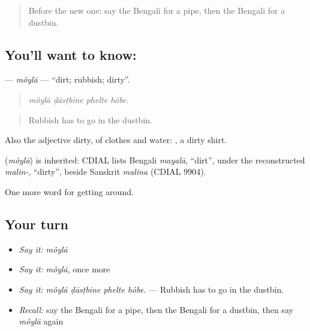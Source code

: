 \begin{quote}
Before the new one: say the Bengali for a pipe, then the Bengali for a dustbin.
\end{quote}

\subsection*{You'll want to know: }
\textbf{} — \emph{môylā} — \textquotedblleft{}dirt; rubbish; dirty\textquotedblright{}.

\begin{quote}
   
\end{quote}

\begin{quote}
\emph{môylā ḍāsṭbine phelte hôbe.}
\end{quote}

\begin{quote}
Rubbish has to go in the dustbin.
\end{quote}

Also the adjective dirty, of clothes and water:  , a dirty shirt.

\begin{cousinweb}
\textbf{} (\emph{môylā}) is inherited: CDIAL lists Bengali \emph{mayalā}, \textquotedblleft{}dirt\textquotedblright{}, under the reconstructed \emph{malin-}, \textquotedblleft{}dirty\textquotedblright{}, beside Sanskrit \emph{malina} (CDIAL 9904).
\end{cousinweb}

\begin{grammarlens}[title={What you've built}]
One more word for getting around.
\end{grammarlens}

\subsection*{Your turn}
\begin{itemize}
\raggedright
  \item \emph{Say it:} \emph{môylā}
  \item \emph{Say it:} \emph{môylā}, once more
  \item \emph{Say it:} \emph{môylā ḍāsṭbine phelte hôbe.} — Rubbish has to go in the dustbin.
  \item \emph{Recall:} say the Bengali for a pipe, then the Bengali for a dustbin, then say \emph{môylā} again
\end{itemize}

